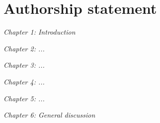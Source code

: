 \chapter*{Authorship statement}
{}

\textit{Chapter 1: Introduction} \\
\lipsum[1]
\vspace{1em}

\textit{Chapter 2: ...} \\
\lipsum[2]
\vspace{1em}

\textit{Chapter 3: ...} \\
\lipsum[3]
\vspace{1em}

\textit{Chapter 4: ...} \\
\lipsum[4]
\vspace{1em}

\textit{Chapter 5: ...} \\
\lipsum[5]
\vspace{1em}

\textit{Chapter 6: General discussion} \\
\lipsum[6]